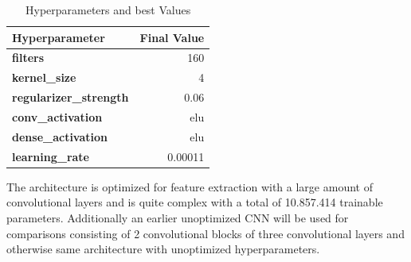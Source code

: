 \begin{table}[H]
    \caption{Hyperparameters and best Values}
    \vspace{0.2cm}
    \label{tab:params}
    \centering
    \begin{adjustbox}{max width=\textwidth}
    \begin{tabular}{l|r}
        \toprule
        \textbf{Hyperparameter}  & \textbf{Final Value} \\
        \midrule
        \textbf{filters} & 160 \\
        \textbf{kernel\_size}  & 4 \\
        \textbf{regularizer\_strength}  & 0.06 \\
        \textbf{conv\_activation}  & elu \\
        \textbf{dense\_activation} & elu \\
        \textbf{learning\_rate} & 0.00011 \\
        \bottomrule
    \end{tabular}
    \end{adjustbox}
\end{table}
\noindent
The architecture is optimized for feature extraction with a large amount of convolutional layers and is quite complex with a total of 10.857.414 trainable parameters. Additionally an earlier unoptimized CNN will be used for comparisons consisting of 2 convolutional blocks of three convolutional layers and otherwise same architecture with unoptimized hyperparameters. 
